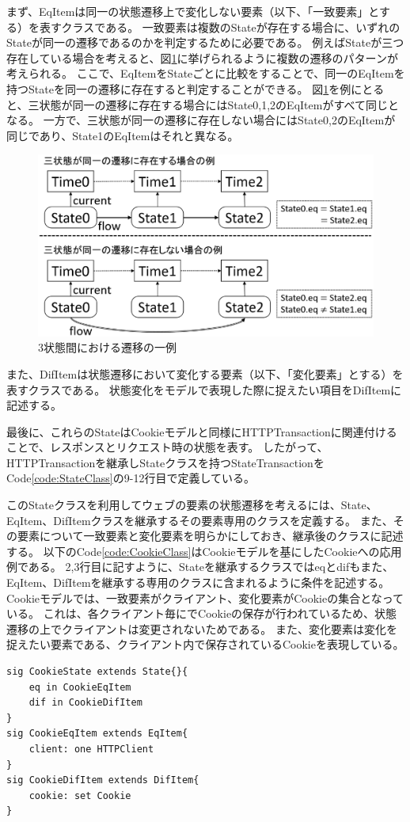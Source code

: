 \documentclass[12pt,a4paper]{jbook}
\begin{document}
まず、EqItemは同一の状態遷移上で変化しない要素（以下、「一致要素」とする）を表すクラスである。
一致要素は複数のStateが存在する場合に、いずれのStateが同一の遷移であるのかを判定するために必要である。
例えばStateが三つ存在している場合を考えると、図\ref{fig:ProposedModel-3StateFlow}に挙げられるように複数の遷移のパターンが考えられる。
ここで、EqItemをStateごとに比較をすることで、同一のEqItemを持つStateを同一の遷移に存在すると判定することができる。
図\ref{fig:ProposedModel-3StateFlow}を例にとると、三状態が同一の遷移に存在する場合にはState0,1,2のEqItemがすべて同じとなる。
一方で、三状態が同一の遷移に存在しない場合にはState0,2のEqItemが同じであり、State1のEqItemはそれと異なる。

\begin{figure}[htb]
\centering
\includegraphics[width=400pt]{./fig/ProposedModel-3StateFlow.eps}
\caption{3状態間における遷移の一例}
\label{fig:ProposedModel-3StateFlow}
\end{figure}

また、DifItemは状態遷移において変化する要素（以下、「変化要素」とする）を表すクラスである。
状態変化をモデルで表現した際に捉えたい項目をDifItemに記述する。

最後に、これらのStateはCookieモデルと同様にHTTPTransactionに関連付けることで、レスポンスとリクエスト時の状態を表す。
したがって、HTTPTransactionを継承しStateクラスを持つStateTransactionをCode\ref{code:StateClass}の9-12行目で定義している。

このStateクラスを利用してウェブの要素の状態遷移を考えるには、State、EqItem、DifItemクラスを継承するその要素専用のクラスを定義する。
また、その要素について一致要素と変化要素を明らかにしておき、継承後のクラスに記述する。
以下のCode\ref{code:CookieClass}はCookieモデルを基にしたCookieへの応用例である。
2,3行目に記すように、Stateを継承するクラスではeqとdifもまた、EqItem、DifItemを継承する専用のクラスに含まれるように条件を記述する。
Cookieモデルでは、一致要素がクライアント、変化要素がCookieの集合となっている。
これは、各クライアント毎にでCookieの保存が行われているため、状態遷移の上でクライアントは変更されないためである。
また、変化要素は変化を捉えたい要素である、クライアント内で保存されているCookieを表現している。
\begin{lstlisting}[caption=Cookieへの応用例, label=code:CookieClass]
sig CookieState extends State{}{
	eq in CookieEqItem
	dif in CookieDifItem
}
sig CookieEqItem extends EqItem{
	client: one HTTPClient
}
sig CookieDifItem extends DifItem{
	cookie: set Cookie
}
\end{lstlisting}
\end{document}
